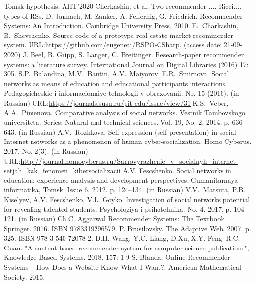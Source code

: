 \documentclass[conference,a4]{IEEEtran}
\begin{document}
\begin{thebibliography}{99}

 Tomsk hypothesis.
 AIIT'2020 Cherkashin, et al. Two recommender ....
 Ricci.... types of RSs.
 D. Jannach, M. Zanker, A. Felfernig, G. Friedrich. Recommender Systems: An Introduction. Cambridge University Press, 2010.
E.~Charkashin, B.~Shevchenko. Source code of a prototype real estate market recommender system.  URL:\url{https://github.com/eugeneai/RSPO-CSharp}. (access date: 21-09-2020)
 J. Beel, B. Gripp, S. Langer, C. Breitinger. Research-paper recommender systems: a literature survey. International Journal on Digital Libraries (2016) 17: 305. 
S.P.~Balandina, M.V.~Bautin, A.V.~Maiyorov, E.R.~Smirnova. Social networks as means of education and educational participants interactions. Pedagogicheskie i informacionniye tehnologii v obraxovanii. No. 15 (2016). (in Russian) URL:\url{https://journals.susu.ru/pit-edu/issue/view/31}
K.S.~Veber, A.A.~Pimenova. Comparative analysis of social networks. Vestnik Tambovskogo universiteta. Series: Natural and technical sciences. Vol. 19, No. 2, 2014. p. 636--643. (in Russian)
A.V.~Rozhkova. Self-expression (self-presentation) in social Internet networks as a phenomenon of human cyber-socialization. Homo Cyberus. 2017. No. 2(3). (in Russian) URL:\url{http://journal.homocyberus.ru/Samovyrazhenie_v_socialnyh_internet-setjah_kak_fenomen_kibersocializacii}
 A.V. Fescshenko. Social networks in education: experience analysis and development perspectives. Gumanitarnaya informatika, Tomsk, Issue 6. 2012. p. 124--134. (in Russian)
V.V.~Matsuta, P.B. Kiselyev, A.V. Fescshenko, V.L. Goyko. Investigation of social networks potential for revealing talented students. Psychologiya i psihotehnika. No. 4. 2017. p. 104--121. (in Russian)
Ch.C. Aggarwal Recommender Systems: The Textbook. Springer. 2016. ISBN 9783319296579.
P. Brusilovsky. The Adaptive Web. 2007. p. 325. ISBN 978-3-540-72078-2.
D.H. Wang, Y.C. Liang, D.Xu, X.Y. Feng, R.C. Guan. "A content-based recommender system for computer science publications", Knowledge-Based Systems. 2018. 157: 1-9
S. Blanda. Online Recommender Systems – How Does a Website Know What I Want?. American Mathematical Society. 2015.

\end{thebibliography}
\end{document}
